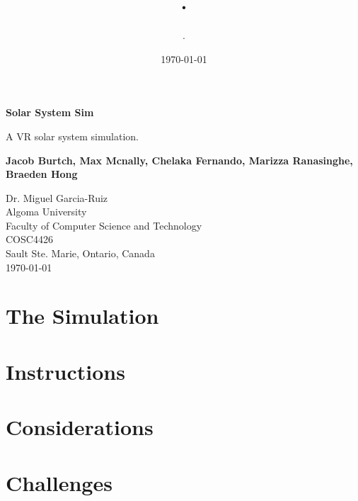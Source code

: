 \documentclass{article}
\author{.}
\title{.}
\date{\today}
\begin{document}
    \begin{titlepage}
        \begin{center}
            \vspace*{\fill}

            \Huge
            \textbf{Solar System Sim}

            \vspace{0.5cm}
            \Large
            A VR solar system simulation.

            \vspace{1.5cm}

            \textbf{Jacob Burtch, Max Mcnally, Chelaka Fernando, Marizza Ranasinghe, Braeden Hong}

            \Large
            Dr. Miguel Garcia-Ruiz\\
            Algoma University\\
            Faculty of Computer Science and Technology\\
            COSC4426\\
            Sault Ste. Marie, Ontario, Canada\\
            \today
            \vspace*{\fill}
        \end{center}
    \end{titlepage}
    \newpage
    \section{The Simulation}
    \section{Instructions}
    \section{Considerations}
    \section{Challenges}
    \newpage
    
    
\end{document}
